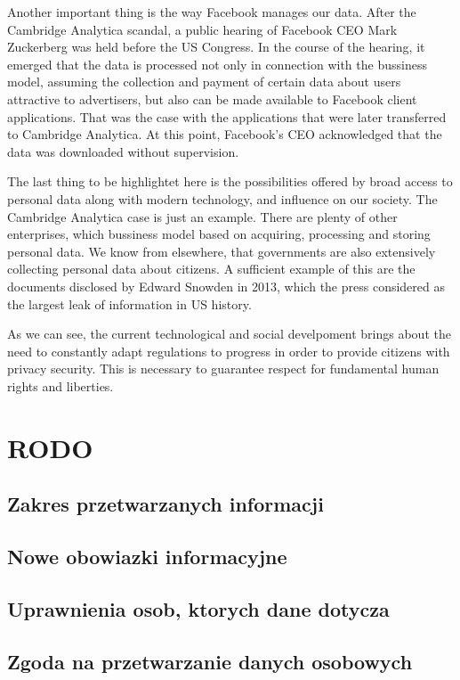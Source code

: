 \documentclass[en, noamssymb]{mgr}
\begin{document}
\indent Another important thing is the way Facebook manages our data. After the Cambridge Analytica scandal, a public hearing of Facebook CEO Mark Zuckerberg was held before the US Congress. In the course of the hearing, it emerged that the data is processed not only in connection with the bussiness model, assuming the collection and payment of certain data about users attractive to advertisers, but also can be made available to Facebook client applications. That was the case with the applications that were later transferred to Cambridge Analytica. At this point, Facebook's CEO acknowledged that the data was downloaded without supervision.     

\indent The last thing to be highlightet here is the possibilities offered by broad access to personal data along with modern technology, and influence on our society.
The Cambridge Analytica case is just an example. There are plenty of other enterprises, which bussiness model based on acquiring, processing and storing personal data. We know from elsewhere, that governments are also extensively collecting personal data about citizens. A sufficient example of this are the documents disclosed by Edward Snowden in 2013, which the press considered as the largest leak of information in US history.

\indent As we can see, the current technological and social develpoment brings about the need to constantly adapt regulations to progress in order to provide citizens with privacy security. This is necessary to guarantee respect for fundamental human rights and liberties.
\chapter{RODO} \label{sec:sekcjaRODO}
\section{Zakres przetwarzanych informacji}
\section{Nowe obowiazki informacyjne}
\section{Uprawnienia osob, ktorych dane dotycza}
\section{Zgoda na przetwarzanie danych osobowych}
\end{document}

